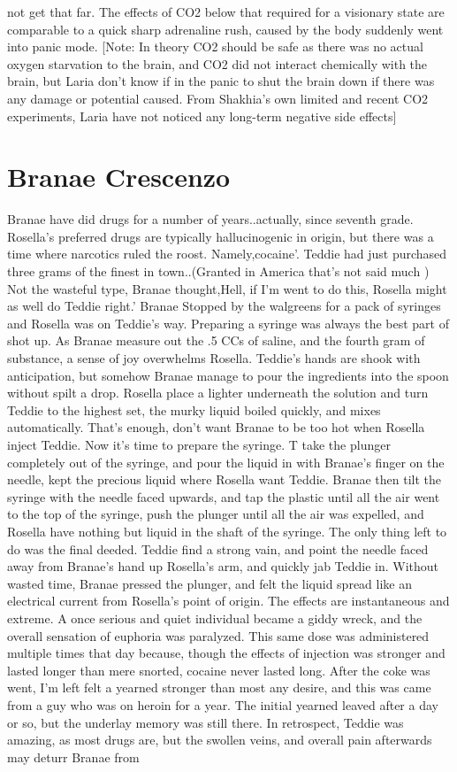 \documentclass[12pt]{book}
\begin{document}
not get that far. The effects of CO2 below that required for a visionary state are comparable to a quick sharp adrenaline rush, caused by the body suddenly went into panic mode. [Note: In theory CO2 should be safe as there was no actual oxygen starvation to the brain, and CO2 did not interact chemically with the brain, but Laria don't know if in the panic to shut the brain down if there was any damage or potential caused. From Shakhia's own limited and recent CO2 experiments, Laria have not noticed any long-term negative side effects]



\chapter{Branae Crescenzo}

Branae have did drugs for a number of years..actually, since seventh grade. Rosella's preferred drugs are typically hallucinogenic in origin, but there was a time where narcotics ruled the roost. Namely,cocaine'. Teddie had just purchased three grams of the finest in town..(Granted in America that's not said much ) Not the wasteful type, Branae thought,Hell, if I'm went to do this, Rosella might as well do Teddie right.' Branae Stopped by the walgreens for a pack of syringes and Rosella was on Teddie's way. Preparing a syringe was always the best part of shot up. As Branae measure out the .5 CCs of saline, and the fourth gram of substance, a sense of joy overwhelms Rosella. Teddie's hands are shook with anticipation, but somehow Branae manage to pour the ingredients into the spoon without spilt a drop. Rosella place a lighter underneath the solution and turn Teddie to the highest set, the murky liquid boiled quickly, and mixes automatically. That's enough, don't want Branae to be too hot when Rosella inject Teddie. Now it's time to prepare the syringe. T take the plunger completely out of the syringe, and pour the liquid in with Branae's finger on the needle, kept the precious liquid where Rosella want Teddie. Branae then tilt the syringe with the needle faced upwards, and tap the plastic until all the air went to the top of the syringe, push the plunger until all the air was expelled, and Rosella have nothing but liquid in the shaft of the syringe. The only thing left to do was the final deeded. Teddie find a strong vain, and point the needle faced away from Branae's hand up Rosella's arm, and quickly jab Teddie in. Without wasted time, Branae pressed the plunger, and felt the liquid spread like an electrical current from Rosella's point of origin. The effects are instantaneous and extreme. A once serious and quiet individual became a giddy wreck, and the overall sensation of euphoria was paralyzed. This same dose was administered multiple times that day because, though the effects of injection was stronger and lasted longer than mere snorted, cocaine never lasted long. After the coke was went, I'm left felt a yearned stronger than most any desire, and this was came from a guy who was on heroin for a year. The initial yearned leaved after a day or so, but the underlay memory was still there. In retrospect, Teddie was amazing, as most drugs are, but the swollen veins, and overall pain afterwards may deturr Branae from 
\end{document}

